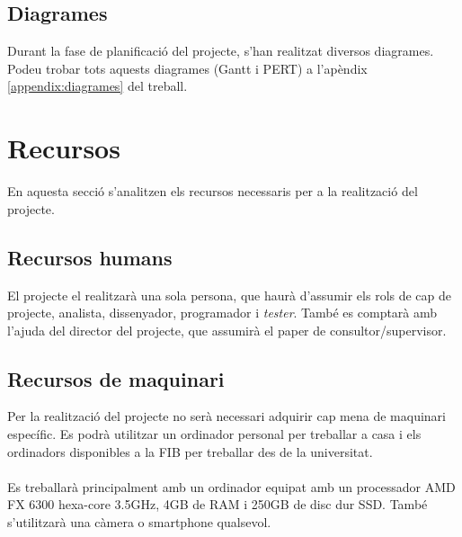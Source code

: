	\subsection{Diagrames}
		Durant la fase de planificació del projecte, s'han realitzat diversos diagrames. Podeu trobar tots aquests diagrames (Gantt i PERT) a l'apèndix \ref{appendix:diagrames} del treball.

\section{Recursos}
	En aquesta secció s'analitzen els recursos necessaris per a la realització del projecte. %
	\subsection{Recursos humans}
		El projecte el realitzarà una sola persona, que haurà d'assumir els rols de cap de projecte, analista, dissenyador, programador i \textit{tester}.
		També es comptarà amb l'ajuda del director del projecte, que assumirà el paper de consultor/supervisor.
	\subsection{Recursos de maquinari}
		Per la realització del projecte no serà necessari adquirir cap mena de maquinari específic. Es podrà utilitzar un ordinador personal per treballar a casa i els ordinadors disponibles a la FIB per
		treballar des de la universitat.\\\\
		Es treballarà principalment amb un ordinador equipat amb un processador AMD FX 6300 hexa-core 3.5GHz, 4GB de RAM i 250GB de disc dur SSD. També s'utilitzarà una càmera o smartphone qualsevol.
